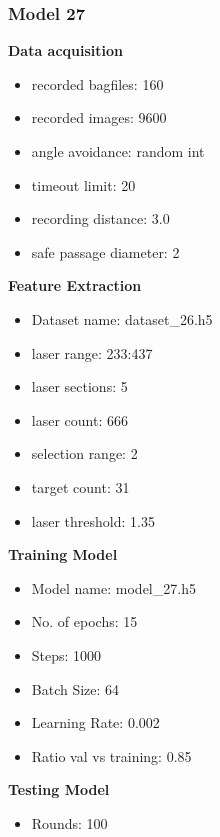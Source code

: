 \subsubsection{Model 27\label{model_27} }
\begin{multicols}{2}\textbf{Data acquisition}
\begin{itemize}
\setlength\itemsep{0.1em}
\item recorded bagfiles: 160
\item recorded images: 9600
\item angle avoidance: random int
\item timeout limit: 20
\item recording distance: 3.0
\item safe passage diameter: 2
\end{itemize}
\textbf{Feature Extraction}
\begin{itemize}
\setlength\itemsep{0.1em}
\item Dataset name: dataset\_26.h5
\item  laser range: 233:437
\item  laser sections: 5
\item  laser count: 666
\item  selection range: 2
\item  target count: 31
\item  laser threshold: 1.35
\end{itemize}
\columnbreak\textbf{Training Model}
\begin{itemize}
\setlength\itemsep{0.1em}
\item  Model name: model\_27.h5
\item  No. of epochs: 15
\item  Steps: 1000
\item  Batch Size: 64
\item  Learning Rate: 0.002
\item  Ratio val vs training: 0.85
\end{itemize}
\textbf{Testing Model}
\begin{itemize}
\setlength\itemsep{0.1em}
\item Rounds: 100
\newline
\newline
\newline
\newline
\newline
\newline
\newline
\newline

\end{itemize}
\end{multicols}
